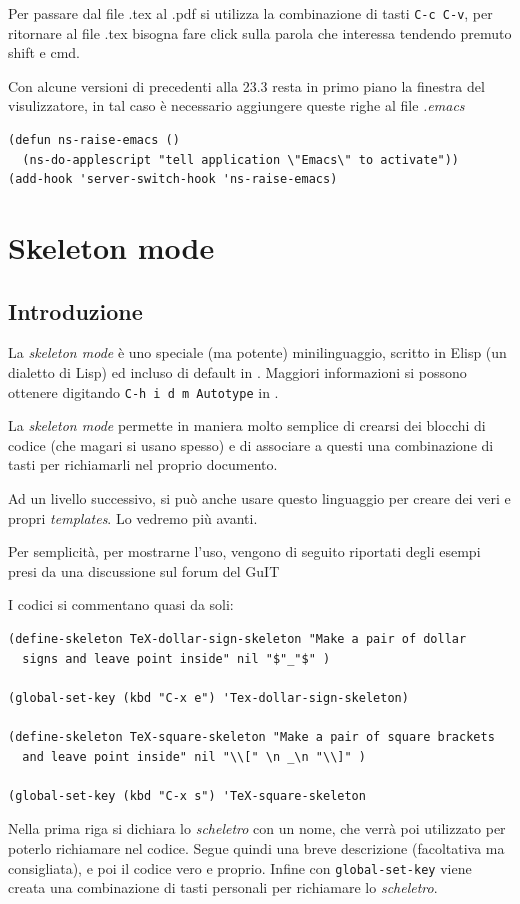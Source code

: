 \documentclass[11pt,a4paper]{article}
\begin{document}
Per passare dal file .tex al .pdf si utilizza la combinazione di tasti
\verb!C-c C-v!, per ritornare al file .tex bisogna fare click sulla
parola che interessa tendendo premuto shift e cmd.

Con alcune versioni di \emacs{} precedenti alla 23.3 resta in primo
piano la finestra del visulizzatore, in tal caso è necessario
aggiungere queste righe al file \emph{.emacs}
\begin{Verbatim}
(defun ns-raise-emacs ()
  (ns-do-applescript "tell application \"Emacs\" to activate"))
(add-hook 'server-switch-hook 'ns-raise-emacs)
\end{Verbatim}

\section{Skeleton mode}
\label{sec:skelmode}

\subsection{Introduzione}
\label{skelintro}

La \emph{skeleton mode} è uno speciale (ma potente) minilinguaggio,
scritto in Elisp (un dialetto di Lisp) ed incluso di default in
\emacs. Maggiori informazioni si possono ottenere digitando
\verb!C-h i d m Autotype! in \emacs.

La \emph{skeleton mode} permette in maniera molto semplice di crearsi
dei blocchi di codice (che magari si usano spesso) e di associare a
questi una combinazione di tasti per richiamarli nel proprio
documento.

Ad un livello successivo, si può anche usare questo linguaggio per
creare dei veri e propri \emph{templates}. Lo vedremo più avanti.

Per semplicità, per mostrarne l'uso, vengono di seguito riportati
degli esempi presi da una discussione sul forum del GuIT %

I codici si
commentano quasi da soli:
\begin{Verbatim}
(define-skeleton TeX-dollar-sign-skeleton "Make a pair of dollar
  signs and leave point inside" nil "$"_"$" )

(global-set-key (kbd "C-x e") 'Tex-dollar-sign-skeleton)

(define-skeleton TeX-square-skeleton "Make a pair of square brackets
  and leave point inside" nil "\\[" \n _\n "\\]" )

(global-set-key (kbd "C-x s") 'TeX-square-skeleton
\end{Verbatim}
Nella prima riga si dichiara lo \emph{scheletro} con un nome, che
verrà poi utilizzato per poterlo richiamare nel codice. Segue quindi
una breve descrizione (facoltativa ma consigliata), e poi il codice
vero e proprio. Infine con \verb!global-set-key! viene creata una
combinazione di tasti personali per richiamare lo \emph{scheletro}.
\end{document}
